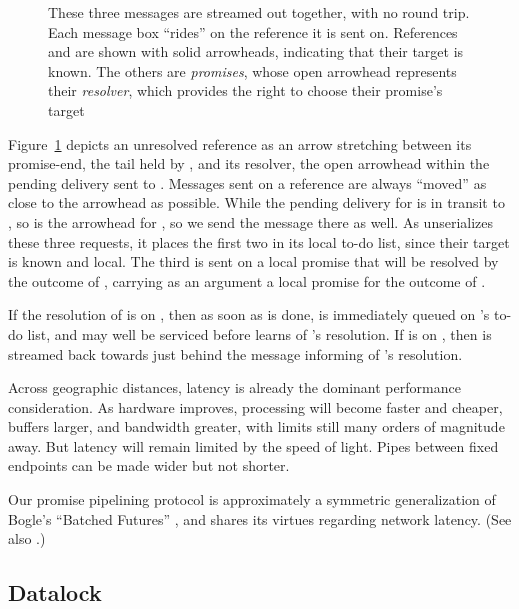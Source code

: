 \documentclass{llncs}
\begin{document}
\begin{figure}
\centerline{}
\caption{These three messages are streamed out together, with no round
  trip. Each message box ``rides'' on the reference it is sent
  on. References  and  are shown with solid arrowheads,
  indicating that their target is known. The others are
  \emph{promises}, whose open arrowhead represents their
  \emph{resolver}, which provides the right to choose their promise's
  target}
\label{fig:pipeline}
\end{figure}

Figure~\ref{fig:pipeline} depicts an unresolved reference as an arrow
stretching between its promise-end, the tail held by , and its
resolver, the open arrowhead within the pending delivery sent to
. Messages sent on a reference are always ``moved'' as close to
the arrowhead as possible. While the pending delivery for 
is in transit to , so is the arrowhead for , so we send
the  message there as well. As  unserializes these
three requests, it places the first two in its local to-do list, since
their target is known and local. The third is sent on a local promise
that will be resolved by the outcome of , carrying as an
argument a local promise for the outcome of .

If the resolution of  is on , then as soon as
 is done,  is immediately queued on 's
to-do list, and may well be serviced before  learns of
's resolution. If  is on , then  is
streamed back towards  just behind the message informing
 of 's resolution.

Across geographic distances, latency is already the dominant
performance consideration. As hardware improves, processing will
become faster and cheaper, buffers larger, and bandwidth greater, with
limits still many orders of magnitude away. But latency will remain
limited by the speed of light. Pipes between fixed endpoints can be
made wider but not shorter. 

Our promise pipelining protocol is approximately a symmetric
generalization of Bogle's ``Batched Futures'' \cite{bogle:batched},
and shares its virtues regarding network latency. (See also
\cite{liskov:promises}.)

\subsection{Datalock}
\end{document}
